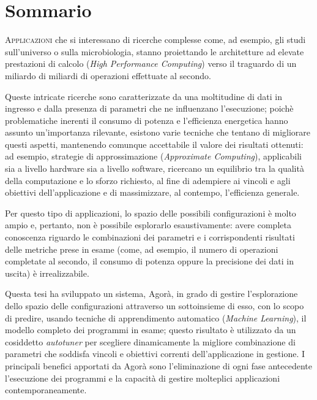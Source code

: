 \chapter*{Sommario}

\lettrine{A}{pplicazioni} che si interessano di ricerche complesse come, ad esempio, gli studi sull'universo o sulla microbiologia, stanno proiettando le architetture ad elevate prestazioni di calcolo (\textit{High Performance Computing}) verso il traguardo di un miliardo di miliardi di operazioni effettuate al secondo.

Queste intricate ricerche sono caratterizzate da una moltitudine di dati in ingresso e dalla presenza di parametri che ne influenzano l'esecuzione; poichè problematiche inerenti il consumo di potenza e l'efficienza energetica hanno assunto un'importanza rilevante, esistono varie tecniche che tentano di migliorare questi aspetti, mantenendo comunque accettabile il valore dei risultati ottenuti: ad esempio, strategie di approssimazione (\textit{Approximate Computing}), applicabili sia a livello hardware sia a livello software, ricercano un equilibrio tra la qualità della computazione e lo sforzo richiesto, al fine di adempiere ai vincoli e agli obiettivi dell'applicazione e di massimizzare, al contempo, l'efficienza generale.

Per questo tipo di applicazioni, lo spazio delle possibili configurazioni è molto ampio e, pertanto, non è possibile esplorarlo esaustivamente: avere completa conoscenza riguardo le combinazioni dei parametri e i corrispondenti risultati delle metriche prese in esame (come, ad esempio, il numero di operazioni completate al secondo, il consumo di potenza oppure la precisione dei dati in uscita) è irrealizzabile.

Questa tesi ha sviluppato un sistema, Agorà, in grado di gestire l'esplorazione dello spazio delle configurazioni attraverso un sottoinsieme di esso, con lo scopo di predire, usando tecniche di apprendimento automatico (\textit{Machine Learning}), il modello completo dei programmi in esame; questo risultato è utilizzato da un cosiddetto \textit{autotuner} per sce\-glie\-re dinamicamente la migliore combinazione di parametri che soddisfa vincoli e obiettivi correnti dell'applicazione in gestione. I principali benefici apportati da Agorà sono l'eliminazione di ogni fase an\-te\-ce\-den\-te l'esecuzione dei programmi e la capacità di gestire molteplici applicazioni contemporaneamente.
